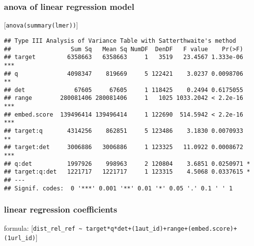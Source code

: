 \documentclass[
  12pt,
  oneside]{book}
\begin{document}
\subsubsection{anova of linear regression model}\label{anova-of-linear-regression-model-3}

{[}\texttt{anova(summary(lmer))}{]}

\begin{verbatim}
## Type III Analysis of Variance Table with Satterthwaite's method
##                 Sum Sq   Mean Sq NumDF  DenDF   F value    Pr(>F)    
## target         6358663   6358663     1   3519   23.4567 1.333e-06 ***
## q              4098347    819669     5 122421    3.0237 0.0098706 ** 
## det              67605     67605     1 118425    0.2494 0.6175055    
## range        280081406 280081406     1   1025 1033.2042 < 2.2e-16 ***
## embed.score  139496414 139496414     1 122690  514.5942 < 2.2e-16 ***
## target:q       4314256    862851     5 123486    3.1830 0.0070933 ** 
## target:det     3006886   3006886     1 123325   11.0922 0.0008672 ***
## q:det          1997926    998963     2 120804    3.6851 0.0250971 *  
## target:q:det   1221717   1221717     1 123315    4.5068 0.0337615 *  
## ---
## Signif. codes:  0 '***' 0.001 '**' 0.01 '*' 0.05 '.' 0.1 ' ' 1
\end{verbatim}

\subsubsection{linear regression coefficients}\label{linear-regression-coefficients-3}

formula: {[}\texttt{dist\_rel\_ref\ \textasciitilde{}\ target*q*det+(1\textbar{}aut\_id)+range+(embed.score)+(1\textbar{}url\_id)}{]}
\end{document}
